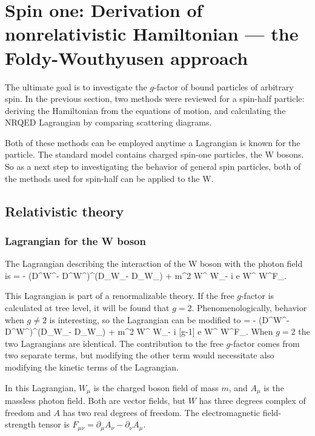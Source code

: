 \chapter{Spin one: Derivation of nonrelativistic Hamiltonian  --- the Foldy-Wouthyusen approach}


The ultimate goal is to investigate the $g$-factor of bound particles of arbitrary spin.  In the previous section, two methods were reviewed for a spin-half particle: deriving the Hamiltonian from the equations of motion, and calculating the NRQED Lagrangian by comparing scattering diagrams.  

Both of these methods can be employed anytime a Lagrangian is known for the particle.  The standard model contains charged spin-one particles, the W bosons.  So as a next step to investigating the behavior of general spin particles, both of the methods used for spin-half can be applied to the W.

\section{Relativistic theory}

\subsection{Lagrangian for the W boson}
The Lagrangian describing the interaction of the W boson with the photon field is
\beq
{} 
	=	- (D^\mu W^\nu - D^\nu W^\mu)^\dagger (D_\mu W_\nu - D_\nu W_\mu)
		+ m^2 W^{\mu \dagger} W_\mu - i e  W^{\mu \dagger} W^\nu F_{\mu\nu}.
\eeq

This Lagrangian is part of a renormalizable theory.  If the free $g$-factor is calculated at tree level, it will be found that $g=2$.  Phenomenologically, behavior when $g \neq 2$ is interesting, so the Lagrangian can be modified to
\beq \label{eq:S1:LagrangianAnom}
	=	- (D^\mu W^\nu - D^\nu W^\mu)^\dagger (D_\mu W_\nu - D_\nu W_\mu)
		+ m^2 W^{\mu \dagger} W_\mu - i [g-1] e  W^{\mu \dagger} W^\nu F_{\mu\nu}.
\eeq
When $g=2$ the two Lagrangians are identical.  The contribution to the free $g$-factor comes from two separate terms, but modifying the other term would necessitate also modifying the kinetic terms of the Lagrangian.  %

In this Lagrangian, $W_\mu$ is the charged boson field of mass $m$, and $A_\mu$ is the massless photon field.  Both are vector fields, but $W$ has three degrees complex of freedom and $A$ has two real degrees of freedom.    The electromagnetic field-strength tensor is $F_{\mu\nu} = \partial_\mu A_\nu - \partial_\nu A_\mu$.  

